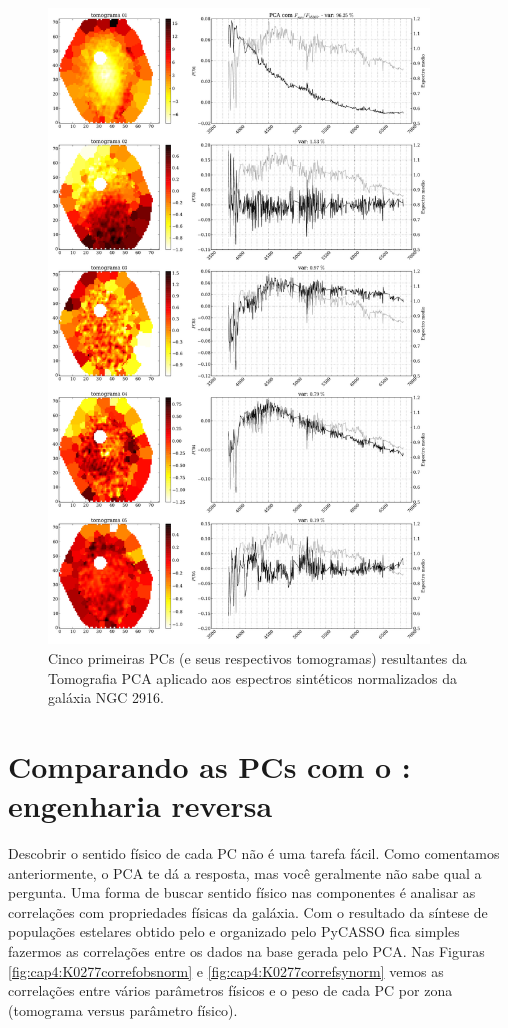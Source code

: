 \begin{figure}
    \includegraphics[width=0.9\textwidth]{figuras/K0277-tomo-syn-norm.pdf}
    \caption[Tomogramas de 1 a 5 da gal\'axia NGC 2916 - $F_{syn} / F_{\lambda 5365}$ .]
    {Cinco primeiras PCs (e seus respectivos tomogramas) resultantes da Tomografia PCA aplicado aos espectros
    sintéticos normalizados da galáxia NGC 2916.}
    \label{fig:cap4:K277tomofsynnorm}
\end{figure}

\section{Comparando as PCs com o \STARLIGHT: engenharia reversa}
\label{sec:cap4:EngRev}

Descobrir o sentido físico de cada PC não é uma tarefa fácil. Como comentamos anteriormente, o PCA te dá a resposta, mas
você geralmente não sabe qual a pergunta. Uma forma de buscar sentido físico nas componentes é analisar as correlações
com propriedades físicas da galáxia. Com o resultado da síntese de populações estelares obtido pelo \starlight e
organizado pelo PyCASSO fica simples fazermos as correlações entre os dados na base gerada pelo PCA. Nas Figuras
\ref{fig:cap4:K0277correfobsnorm} e \ref{fig:cap4:K0277correfsynorm} vemos as correlações entre vários parâmetros
físicos e o peso de cada PC por zona (tomograma versus parâmetro físico).

